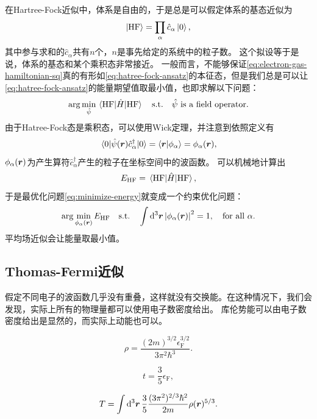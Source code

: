 \documentclass[hyperref, UTF8, a4paper]{ctexart}
\newcommand*{\suchthat}{\quad \text{s.t.} \quad}
\newcommand*{\argmin}{\arg\min}
\begin{document}
在Hartree-Fock近似中，体系是自由的，于是总是可以假定体系的基态近似为
\begin{equation}
    \ket{\text{HF}} = \prod_\alpha \hat{c}_\alpha \ket{0},
    \label{eq:hatree-fock-ansatz}
\end{equation}
其中参与求和的$\hat{c}_\alpha$共有$n$个，$n$是事先给定的系统中的粒子数。
这个拟设等于是说，体系的基态和某个乘积态非常接近。
一般而言，不能够保证\eqref{eq:electron-gas-hamiltonian-sq}真的有形如\eqref{eq:hatree-fock-ansatz}的本征态，但是我们总是可以让\eqref{eq:hatree-fock-ansatz}的能量期望值取最小值，也即求解以下问题：
\begin{equation}
    \argmin_{\hat{\psi}} \mel{\text{HF}}{\hat{H}}{\text{HF}} \suchthat \text{$\hat{\psi}$ is a field operator}.
    \label{eq:minimize-energy}
\end{equation}
由于Hatree-Fock态是乘积态，可以使用Wick定理，并注意到依照定义有
\[
    \mel{0}{\hat{\psi}(\vb*{r})\hat{c}^\dagger_\alpha}{0} = \braket{\vb*{r}}{\phi_\alpha} = \phi_\alpha(\vb*{r}),
\]
$\phi_\alpha(\vb*{r})$为产生算符$\hat{c}^\dagger_\alpha$产生的粒子在坐标空间中的波函数。
可以机械地计算出
\[
    E_\text{HF} = \mel{\text{HF}}{\hat{H}}{\text{HF}},
\]
于是最优化问题\eqref{eq:minimize-energy}就变成一个约束优化问题：
\[
    \argmin_{\phi_\alpha(\vb*{r})} E_\text{HF} \suchthat \int \dd[3]{\vb*{r}} \abs{\phi_\alpha(\vb*{r})}^2 = 1, \quad \text{for all $\alpha$}.
\]
平均场近似会让能量取最小值。

\subsection{Thomas-Fermi近似}

假定不同电子的波函数几乎没有重叠，这样就没有交换能。在这种情况下，我们会发现，实际上所有的物理量都可以使用电子数密度给出。
库伦势能可以由电子数密度给出是显然的，而实际上动能也可以。

\begin{equation}
    \rho = \frac{(2m)^{3/2} \epsilon_\text{F}^{3/2}}{3 \pi^2 \hbar^3}.
\end{equation}

\begin{equation}
    t = \frac{3}{5} \epsilon_\text{F},
\end{equation}

\begin{equation}
    T = \int \dd[3]{\vb*{r}} \frac{3}{5} \frac{(3\pi^2)^{2/3} \hbar^2}{2m} \rho(\vb*{r})^{5/3}.
\end{equation}
\end{document}
